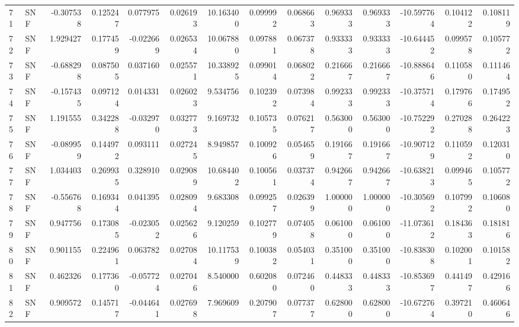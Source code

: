 \begin{tabular}{llrrrrrrrrrrrr}
71  &    SNF & -0.307538 &      0.125247 &  0.077975 &    0.026193 &  10.163400 &      0.099992 &   0.068663 &  0.969333 &  0.969333 & -10.597764 &     0.104122 &     0.108119 \\
72  &    SNF &  1.929427 &      0.177459 & -0.022669 &    0.026534 &  10.067880 &      0.097881 &   0.067378 &  0.933333 &  0.933333 & -10.644452 &     0.099578 &     0.105772 \\
73  &    SNF & -0.688298 &      0.087505 &  0.037160 &    0.025571 &  10.338925 &      0.099014 &   0.068022 &  0.216667 &  0.216667 & -10.888646 &     0.110580 &     0.111464 \\
74  &    SNF & -0.157435 &      0.097124 &  0.014331 &    0.026023 &   9.534756 &      0.102392 &   0.073984 &  0.992333 &  0.992333 & -10.375714 &     0.179766 &     0.174952 \\
75  &    SNF &  1.191555 &      0.342288 & -0.032970 &    0.032773 &   9.169732 &      0.105735 &   0.076217 &  0.563000 &  0.563000 & -10.752292 &     0.270288 &     0.264223 \\
76  &    SNF & -0.089959 &      0.144972 &  0.093111 &    0.027245 &   8.949857 &      0.100926 &   0.054659 &  0.191667 &  0.191667 & -10.907129 &     0.110592 &     0.120310 \\
77  &    SNF &  1.034403 &      0.269935 &  0.328910 &    0.029089 &  10.684402 &      0.100561 &   0.037374 &  0.942667 &  0.942667 & -10.638213 &     0.099465 &     0.105772 \\
78  &    SNF & -0.556768 &      0.169344 &  0.041395 &    0.028094 &   9.683308 &      0.099257 &   0.026399 &  1.000000 &  1.000000 & -10.305692 &     0.107992 &     0.106080 \\
79  &    SNF &  0.947756 &      0.173085 & -0.023052 &    0.025626 &   9.120259 &      0.102779 &   0.074058 &  0.061000 &  0.061000 & -11.073612 &     0.184363 &     0.181816 \\
80  &    SNF &  0.901155 &      0.224961 &  0.063782 &    0.027084 &  10.117539 &      0.100382 &   0.054031 &  0.351000 &  0.351000 & -10.838308 &     0.102001 &     0.101582 \\
81  &    SNF &  0.462326 &      0.177360 & -0.057724 &    0.027046 &   8.540000 &      0.602080 &   0.072460 &  0.448333 &  0.448333 & -10.853697 &     0.441497 &     0.429166 \\
82  &    SNF &  0.909572 &      0.145717 & -0.044641 &    0.027698 &   7.969609 &      0.207907 &   0.077377 &  0.628000 &  0.628000 & -10.672764 &     0.397210 &     0.460646 \\

\end{tabular}
